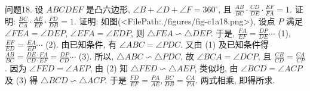 问题18. 设 $A B C D E F$ 是凸六边形, $\angle B+\angle D+\angle F=360^{\circ}$, 且 $\frac{A B}{B C} \cdot \frac{C D}{D E} \cdot \frac{E F}{F A}=1$.
证明: $\frac{B C}{C A} \cdot \frac{A E}{E F} \cdot \frac{F D}{D B}=1$.
证明: 如图(<FilePath:./figures/fig-c1a18.png>), 设点 $P$ 满足 $\angle F E A=\angle D E P$,
$\angle E F A=\angle E D P$, 则 $\triangle F E A \backsim \triangle D E P$. 于是, $\frac{F A}{E F}=\frac{D P}{D E} \cdots$ (1), $\frac{E F}{E D}=\frac{E A}{E P} \cdots$ (2). 由已知条件, 有 $\angle A B C=\angle P D C$. 又由 (1) 及已知条件得 $\frac{A B}{B C}= \frac{D E \cdot F A}{C D \cdot E F}=\frac{D P}{C D} \cdots$ (3). 所以, $\triangle A B C \backsim \triangle P D C$, 故 $\angle B C A=\angle D C P$, 且 $\frac{C B}{C D}=\frac{C A}{C P}$. 因为 $\angle F E D=\angle A E P$, 由 (2) 知 $\triangle F E D \backsim \triangle A E P$, 类似地, 由 $\angle B C D=\angle A C P$ 及 (3) 得 $\triangle B C D \backsim \triangle A C P$. 于是 $\frac{F D}{E F}=\frac{P A}{A E}, \frac{B C}{D B}=\frac{C A}{P A}$. 两式相乘, 即得所求.


